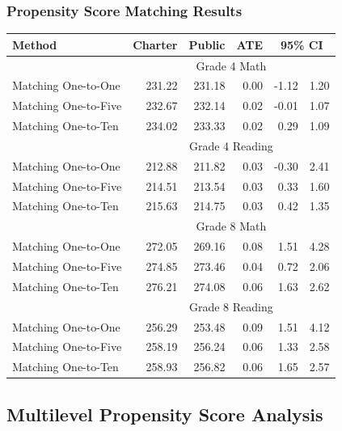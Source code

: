 \documentclass[10pt,handout,mathserif]{beamer}
\begin{document}
\begin{frame}[c]
    \frametitle{Propensity Score Matching Results}
\begin{table}[ht]
\centering
\begin{tabular}{lrrrrr}
  \hline Method & Charter & Public & ATE & \multicolumn{2}{c}{95\% CI} \\   \hline & \multicolumn{5}{c}{Grade 4 Math} \\ \cline{2-6} 
  Matching One-to-One & 231.22 & 231.18 & 0.00 & -1.12 & 1.20 \\ 
  Matching One-to-Five & 232.67 & 232.14 & 0.02 & -0.01 & 1.07 \\ 
  Matching One-to-Ten & 234.02 & 233.33 & 0.02 & 0.29 & 1.09 \\ 
    \hline & \multicolumn{5}{c}{Grade 4 Reading} \\ \cline{2-6} 
  Matching One-to-One & 212.88 & 211.82 & 0.03 & -0.30 & 2.41 \\ 
  Matching One-to-Five & 214.51 & 213.54 & 0.03 & 0.33 & 1.60 \\ 
  Matching One-to-Ten & 215.63 & 214.75 & 0.03 & 0.42 & 1.35 \\ 
    \hline & \multicolumn{5}{c}{Grade 8 Math} \\ \cline{2-6} 
  Matching One-to-One & 272.05 & 269.16 & 0.08 & 1.51 & 4.28 \\ 
  Matching One-to-Five & 274.85 & 273.46 & 0.04 & 0.72 & 2.06 \\ 
  Matching One-to-Ten & 276.21 & 274.08 & 0.06 & 1.63 & 2.62 \\ 
    \hline & \multicolumn{5}{c}{Grade 8 Reading} \\ \cline{2-6} 
  Matching One-to-One & 256.29 & 253.48 & 0.09 & 1.51 & 4.12 \\ 
  Matching One-to-Five & 258.19 & 256.24 & 0.06 & 1.33 & 2.58 \\ 
  Matching One-to-Ten & 258.93 & 256.82 & 0.06 & 1.65 & 2.57 \\ 
   \hline
\end{tabular}
\label{tab:overall}
\end{table}

\end{frame}


\subsection{Multilevel Propensity Score Analysis}
\end{document}
